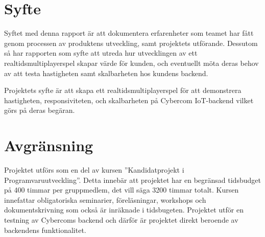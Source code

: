 \section{Syfte}
\label{sec:aim}
Syftet med denna rapport är att dokumentera erfarenheter som teamet har fått genom processen av produktens utveckling, samt projektets utförande. Dessutom så
 har rapporten som syfte att utreda hur utvecklingen av ett realtidsmultiplayerspel skapar värde för kunden, och eventuellt möta deras behov av att testa hastigheten samt skalbarheten hos kundens backend.


Projektets syfte är att skapa ett realtidsmultiplayerspel för att demonstrera hastigheten, responsiviteten, och skalbarheten på Cybercom IoT-backend vilket görs på deras begäran.
\section{Avgränsning}
\label{sec:delimitations}

Projektet utförs som en del av kursen ''Kandidatprojekt i Programvaruutveckling''. Detta innebär att projektet har en begränsad tidsbudget på 400 timmar
per gruppmedlem, det vill säga 3200 timmar totalt. Kursen innefattar obligatoriska seminarier, föreläsningar, workshops och dokumentskrivning som också är inräknade i tidsbugeten.
Projektet utför en testning av Cybercoms backend och därför är projektet direkt beroende av backendens funktionalitet.
